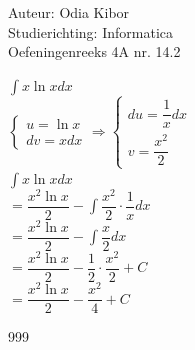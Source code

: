 \documentclass[a4paper]{article}
\begin{document}
  
\noindent \large Auteur: Odia Kibor \\
\noindent \large Studierichting: Informatica\\
\noindent \large Oefeningenreeks 4A nr. 14.2\\

\medskip

\normalsize


$\displaystyle\int  x \ln x dx$\\

$\left\{
\begin{array}{l}
	u=\ln x \\ 
	dv=xdx
\end{array}\right.
\Rightarrow 
\left\{
\begin{array}{l}
	du= \dfrac{1}{x} dx\\
 	v=\dfrac{x^2}{2}
\end{array}
\right.$\\

$\displaystyle\int  x \ln x dx$\\

$= \dfrac{x^2 \ln x}{2} - \displaystyle\int \dfrac{x^2}{2} \cdot \dfrac{1}{x} dx$ \\

$= \dfrac{x^2 \ln x}{2} - \displaystyle\int \dfrac{x}{2}dx$ \\

$= \dfrac{x^2 \ln x}{2} - \dfrac{1}{2} \cdot \dfrac{x^2}{2} + C$\\

$= \dfrac{x^2 \ln x}{2} - \dfrac{x^2}{4} + C$\\



















\begin{thebibliography}{999}
\end{thebibliography}
\end{document}
